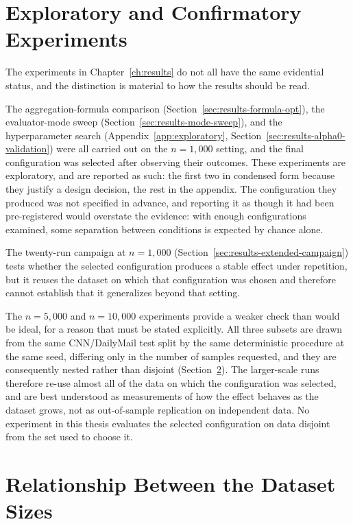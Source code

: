 \section{Exploratory and Confirmatory Experiments}
\label{sec:methodology-exploratory}

The experiments in Chapter~\ref{ch:results} do not all have the same evidential
status, and the distinction is material to how the results should be read.

The aggregation-formula comparison (Section~\ref{sec:results-formula-opt}), the
evaluator-mode sweep (Section~\ref{sec:results-mode-sweep}), and the
hyperparameter search (Appendix~\ref{app:exploratory},
Section~\ref{sec:results-alpha0-validation}) were all
carried out on the $n=1{,}000$ setting, and the final configuration was selected
after observing their outcomes. These experiments are exploratory, and are
reported as such: the first two in condensed form because they justify a design
decision, the rest in the appendix. The
configuration they produced was not specified in advance, and reporting it as
though it had been pre-registered would overstate the evidence: with enough
configurations examined, some separation between conditions is expected by chance
alone.

The twenty-run campaign at $n=1{,}000$
(Section~\ref{sec:results-extended-campaign}) tests whether the selected
configuration produces a stable effect under repetition, but it reuses the
dataset on which that configuration was chosen and therefore cannot establish
that it generalizes beyond that setting.

The $n=5{,}000$ and $n=10{,}000$ experiments provide a weaker check than would be
ideal, for a reason that must be stated explicitly. All three subsets are drawn
from the same CNN/DailyMail test split by the same deterministic procedure at the
same seed, differing only in the number of samples requested, and they are
consequently nested rather than disjoint
(Section~\ref{sec:methodology-nesting}). The larger-scale runs therefore
re-use almost all of the data on which the configuration was selected, and are
best understood as measurements of how the effect behaves as the dataset grows,
not as out-of-sample replication on independent data. No experiment in this thesis
evaluates the selected configuration on data disjoint from the set used to choose
it.

\section{Relationship Between the Dataset Sizes}
\label{sec:methodology-nesting}

